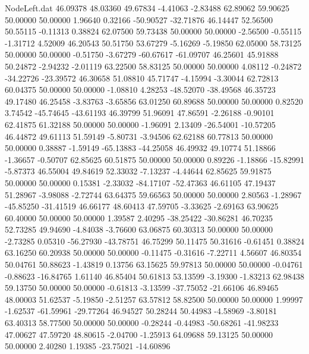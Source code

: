 \begin{filecontents}{NodeLeft.dat}
  46.09378   48.03360   49.67834    -4.41063   -2.83488   62.89062   59.90625   50.00000   50.00000    1.96640    0.32166  -50.90527  -32.71876
  46.14447   52.56500   50.55115    -0.11313    0.38824   62.07500   59.73438   50.00000   50.00000   -2.56500   -0.55115   -1.31712    4.52009
  46.20543   50.51750   53.67279    -5.16269   -5.19850   62.05000   58.73125   50.00000   50.00000   -0.51750   -3.67279  -60.67617  -61.09707
  46.25601   45.91888   50.24872    -2.94232   -2.01119   63.22500   58.83125   50.00000   50.00000    4.08112   -0.24872  -34.22726  -23.39572
  46.30658   51.08810   45.71747    -4.15994   -3.30044   62.72813   60.04375   50.00000   50.00000   -1.08810    4.28253  -48.52070  -38.49568
  46.35723   49.17480   46.25458    -3.83763   -3.65856   63.01250   60.89688   50.00000   50.00000    0.82520    3.74542  -45.74645  -43.61193
  46.39799   51.96091   47.86591    -2.26188   -0.90101   62.41875   61.32188   50.00000   50.00000   -1.96091    2.13409  -26.54001  -10.57205
  46.44872   49.61113   51.59149    -5.80731   -3.94506   62.62188   60.77813   50.00000   50.00000    0.38887   -1.59149  -65.13883  -44.25058
  46.49932   49.10774   51.18866    -1.36657   -0.50707   62.85625   60.51875   50.00000   50.00000    0.89226   -1.18866  -15.82991   -5.87373
  46.55004   49.84619   52.33032    -7.13237   -4.44644   62.85625   59.91875   50.00000   50.00000    0.15381   -2.33032  -84.17107  -52.47363
  46.61105   47.19437   51.28967    -3.98088   -2.72744   63.64375   59.66563   50.00000   50.00000    2.80563   -1.28967  -45.85250  -31.41519
  46.66177   48.60413   47.59705    -3.33625   -2.69163   63.90625   60.40000   50.00000   50.00000    1.39587    2.40295  -38.25422  -30.86281
  46.70235   52.73285   49.94690    -4.84038   -3.76600   63.06875   60.30313   50.00000   50.00000   -2.73285    0.05310  -56.27930  -43.78751
  46.75299   50.11475   50.31616    -0.61451    0.38824   63.16250   60.20938   50.00000   50.00000   -0.11475   -0.31616   -7.22711    4.56607
  46.80354   50.04761   50.88623    -1.43819    0.13756   63.15625   59.97813   50.00000   50.00000   -0.04761   -0.88623  -16.84765    1.61140
  46.85404   50.61813   53.13599    -3.19300   -1.83213   62.98438   59.13750   50.00000   50.00000   -0.61813   -3.13599  -37.75052  -21.66106
  46.89465   48.00003   51.62537    -5.19850   -2.51257   63.57812   58.82500   50.00000   50.00000    1.99997   -1.62537  -61.59961  -29.77264
  46.94527   50.28244   50.44983    -4.58969   -3.80181   63.40313   58.77500   50.00000   50.00000   -0.28244   -0.44983  -50.68261  -41.98233
  47.00627   47.59720   48.80615    -2.04700   -1.25913   64.09688   59.13125   50.00000   50.00000    2.40280    1.19385  -23.75021  -14.60896

\end{filecontents}
